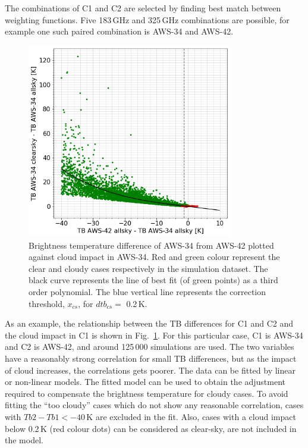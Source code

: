 \documentclass[12pt]{article}
\begin{document}
The combinations of C1 and C2 are selected by finding best match between
weighting functions. Five 183\,GHz and 325\,GHz combinations are possible, for
example one such paired combination is AWS-34 and AWS-42.

\begin{figure}[!b]
	\centering
	\includegraphics[height=85mm]{fit_AWS-34_AWS-42}\hspace{5mm}%
	\caption{Brightness temperature difference of AWS-34 from AWS-42 plotted
      against cloud impact in AWS-34. Red and green colour represent the clear
      and cloudy cases respectively in the simulation dataset. The black curve
      represents the line of best fit (of green points) as a third order
      polynomial. The blue vertical line represents the correction threshold,
      $x_{cs}$, for $dtb_{cs} =$ 0.2\,K. }
	\label{fig:fit:c34-42}
\end{figure}
%

As an example, the relationship between the TB differences for C1 and C2 and
the cloud impact in C1 is shown in Fig.~\ref{fig:fit:c34-42}. For this
particular case, C1 is AWS-34 and C2 is AWS-42, and around 125\,000 simulations
are used. The two variables have a reasonably strong correlation for small TB
differences, but as the impact of cloud increases, the correlations gets
poorer. The data can be fitted by linear or non-linear models. The fitted model
can be used to obtain the adjustment required to compensate the brightness
temperature for cloudy cases. To avoid fitting the ``too cloudy'' cases which
do not show any reasonable correlation, cases with $Tb2-Tb1< -40$\,K are
excluded in the fit. Also, cases with a cloud impact below 0.2\,K (red colour
dots) can be considered as clear-sky, are not included in the model.
\end{document}
